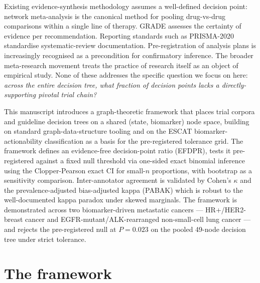\documentclass[11pt,a4paper]{article}
\begin{document}
Existing evidence-synthesis methodology assumes a well-defined decision point: network meta-analysis is the canonical method for pooling drug-vs-drug comparisons within a single line of therapy.\citep{rouse2017nma,higgins2019cochrane} GRADE assesses the certainty of evidence per recommendation.\citep{guyatt2008grade} Reporting standards such as PRISMA-2020 standardise systematic-review documentation.\citep{moher2020prisma} Pre-registration of analysis plans is increasingly recognised as a precondition for confirmatory inference.\citep{munafo2017manifesto} The broader meta-research movement\citep{ioannidis2005false} treats the practice of research itself as an object of empirical study. None of these addresses the specific question we focus on here: \emph{across the entire decision tree, what fraction of decision points lacks a directly-supporting pivotal trial chain?}

This manuscript introduces a graph-theoretic framework that places trial corpora and guideline decision trees on a shared (state, biomarker) node space, building on standard graph-data-structure tooling\citep{hagberg2008networkx} and on the ESCAT biomarker-actionability classification\citep{mateo2018escat} as a basis for the pre-registered tolerance grid. The framework defines an evidence-free decision-point ratio (EFDPR), tests it pre-registered against a fixed null threshold via one-sided exact binomial inference using the Clopper-Pearson exact CI for small-$n$ proportions,\citep{clopper1934} with bootstrap as a sensitivity comparison.\citep{efron1979bootstrap} Inter-annotator agreement is validated by Cohen's $\kappa$\citep{cohen1960kappa} and the prevalence-adjusted bias-adjusted kappa (PABAK)\citep{byrt1993pabak,viera2005} which is robust to the well-documented kappa paradox under skewed marginals. The framework is demonstrated across two biomarker-driven metastatic cancers --- HR+/HER2- breast cancer and EGFR-mutant/ALK-rearranged non-small-cell lung cancer --- and rejects the pre-registered null at $P = 0.023$ on the pooled 49-node decision tree under strict tolerance.

\section{The framework}\label{sec:framework}
\end{document}
